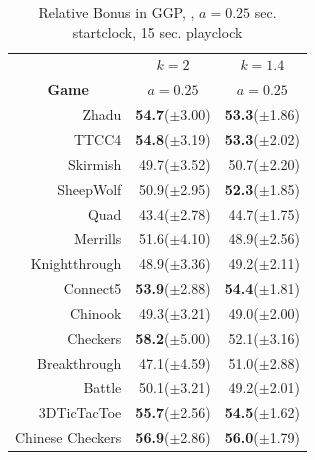 \documentclass{ecai2014}
\begin{document}
\begin{table}
{\caption{Relative Bonus in GGP, {}, $a = 0.25$  sec. startclock, 15 sec. playclock} \label{tab:rb_ggp}}
\begin{center}
\begin{tabular}{rrr}
\hline
& \multicolumn{1}{c}{\textbf{$k = 2$}} & \multicolumn{1}{c}{\textbf{$k = 1.4$}} \\
\cline{1-3}
\multicolumn{1}{c|}{\rule{0pt}{12pt}\textbf{Game}} & \multicolumn{1}{c}{\textbf{$a = 0.25$}} & \multicolumn{1}{c}{\textbf{$a = 0.25$}} \\ \hline
\multicolumn{1}{r|}{Zhadu} 				&{\bf{54.7}}($\pm$3.00)	& {\bf{53.3}}($\pm$1.86) \\
\multicolumn{1}{r|}{TTCC4} 				&{\bf{54.8}}($\pm$3.19)	& {\bf{53.3}}($\pm$2.02) \\
\multicolumn{1}{r|}{Skirmish} 			&49.7($\pm$3.52)		& 50.7($\pm$2.20) \\
\multicolumn{1}{r|}{SheepWolf} 			&50.9($\pm$2.95)		& {\bf{52.3}}($\pm$1.85) \\
\multicolumn{1}{r|}{Quad} 				&43.4($\pm$2.78)		& 44.7($\pm$1.75) \\
\multicolumn{1}{r|}{Merrills} 			&51.6($\pm$4.10)		& 48.9($\pm$2.56) \\
\multicolumn{1}{r|}{Knightthrough}		&48.9($\pm$3.36)		& 49.2($\pm$2.11) \\
\multicolumn{1}{r|}{Connect5} 			&{\bf{53.9}}($\pm$2.88)	& {\bf{54.4}}($\pm$1.81) \\
\multicolumn{1}{r|}{Chinook} 			&49.3($\pm$3.21)		& 49.0($\pm$2.00) \\
\multicolumn{1}{r|}{Checkers} 			&{\bf{58.2}}($\pm$5.00)	& 52.1($\pm$3.16) \\
\multicolumn{1}{r|}{Breakthrough}		&47.1($\pm$4.59)		& 51.0($\pm$2.88) \\
\multicolumn{1}{r|}{Battle}				&50.1($\pm$3.21)		& 49.2($\pm$2.01) \\
\multicolumn{1}{r|}{3DTicTacToe}		&{\bf{55.7}}($\pm$2.56)	& {\bf{54.5}}($\pm$1.62) \\
\multicolumn{1}{r|}{Chinese Checkers}	&{\bf{56.9}}($\pm$2.86)	& {\bf{56.0}}($\pm$1.79) \\
\hline
\end{tabular}
\end{center}
\end{table}
\end{document}
